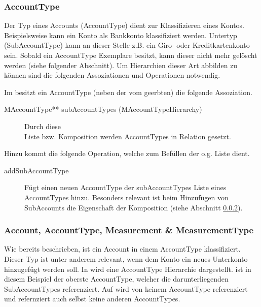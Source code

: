 \subsubsection{AccountType}
Der Typ eines Accounts (AccountType) dient zur Klassifizieren eines Kontos. Beispielsweise kann ein Konto als Bankkonto klassifiziert werden. Untertyp (SubAccountType) kann an dieser Stelle z.B. ein Giro- oder Kreditkartenkonto sein.
Sobald ein AccountType Exemplare besitzt, kann dieser nicht mehr gelöscht werden (siehe folgender Abschnitt). Um Hierarchien dieser Art abbilden zu können sind die folgenden Assoziationen und Operationen notwendig. 

Im \MM besitzt ein AccountType (neben der vom  geerbten) die folgende Assoziation.
\begin{description}
	\item[MAccountType** subAccountTypes (MAccountTypeHierarchy)] Durch diese \\Liste bzw. Komposition werden AccountTypes in Relation gesetzt.
\end{description}

Hinzu kommt die folgende Operation, welche zum Befüllen der o.g. Liste dient.
\begin{description}
	\item[addSubAccountType] Fügt einen neuen AccountType der subAccountTypes Liste eines AccountTypes hinzu. Besonders relevant ist beim Hinzufügen 
	von SubAccounts die Eigenschaft der Komposition (siehe Abschnitt \ref{Measurement:accUndAccType}).
\end{description}


\subsubsection{Account, AccountType, Measurement \& MeasurementType}\label{Measurement:accUndAccType}
Wie bereits beschrieben, ist ein Account in einem AccountType klassifiziert. Dieser Typ ist unter anderem relevant, wenn dem Konto ein neues Unterkonto hinzugefügt werden soll.  
In  wird eine AccountType Hierarchie dargestellt.  ist in diesem Beispiel der oberste AccountType, welcher die darunterliegenden SubAccountTypes referenziert. 
Auf  wird von keinem AccountType referenziert und refernziert auch selbst keine anderen AccountTypes.  


